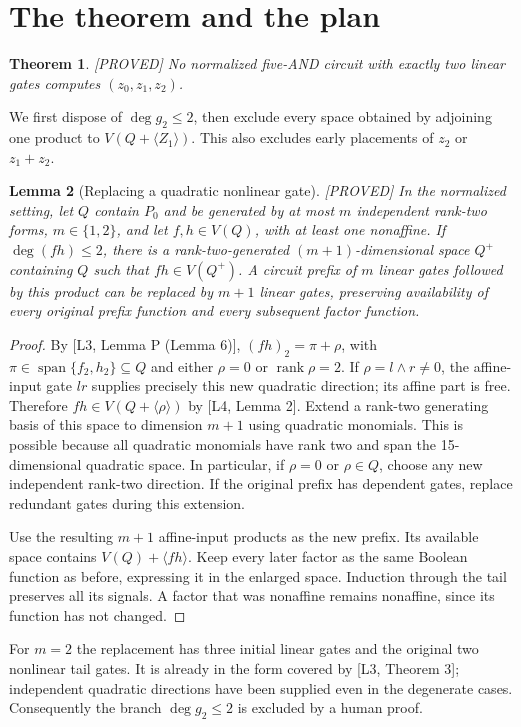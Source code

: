 \documentclass[11pt,a4paper]{article}
\newtheorem{theorem}{Theorem}
\newtheorem{lemma}[theorem]{Lemma}
\newcommand{\Span}{\operatorname{span}}
\newcommand{\rk}{\operatorname{rank}}
\newcommand{\status}[1]{\hfill\textsf{[#1]}}
\begin{document}
\section{The theorem and the plan}
\begin{theorem}\label{thm:main}\status{PROVED}
No normalized five-AND circuit with exactly two linear gates computes $(z_0,z_1,z_2)$.
\end{theorem}
We first dispose of $\deg g_2\le2$, then exclude every space obtained by adjoining one product to $V(Q+\langle Z_1\rangle)$. This also excludes early placements of $z_2$ or $z_1+z_2$.

\begin{lemma}[Replacing a quadratic nonlinear gate]\label{lem:replace}\status{PROVED}
In the normalized setting, let $Q$ contain $P_0$ and be generated by at most $m$ independent rank-two forms, $m\in\{1,2\}$, and let $f,h\in V(Q)$, with at least one nonaffine. If $\deg(fh)\le2$, there is a rank-two-generated $(m+1)$-dimensional space $Q^+$ containing $Q$ such that $fh\in V(Q^+)$. A circuit prefix of $m$ linear gates followed by this product can be replaced by $m+1$ linear gates, preserving availability of every original prefix function and every subsequent factor function.
\end{lemma}
\begin{proof}
By [L3, Lemma P (Lemma 6)], $(fh)_2=\pi+\rho$, with $\pi\in\Span\{f_2,h_2\}\subseteq Q$ and either $\rho=0$ or $\rk\rho=2$. If $\rho=l\wedge r\ne0$, the affine-input gate $lr$ supplies precisely this new quadratic direction; its affine part is free. Therefore $fh\in V(Q+\langle\rho\rangle)$ by [L4, Lemma 2]. Extend a rank-two generating basis of this space to dimension $m+1$ using quadratic monomials. This is possible because all quadratic monomials have rank two and span the 15-dimensional quadratic space. In particular, if $\rho=0$ or $\rho\in Q$, choose any new independent rank-two direction. If the original prefix has dependent gates, replace redundant gates during this extension.

Use the resulting $m+1$ affine-input products as the new prefix. Its available space contains $V(Q)+\langle fh\rangle$. Keep every later factor as the same Boolean function as before, expressing it in the enlarged space. Induction through the tail preserves all its signals. A factor that was nonaffine remains nonaffine, since its function has not changed.
\end{proof}
For $m=2$ the replacement has three initial linear gates and the original two nonlinear tail gates. It is already in the form covered by [L3, Theorem 3]; independent quadratic directions have been supplied even in the degenerate cases. Consequently the branch $\deg g_2\le2$ is excluded by a human proof.
\end{document}
